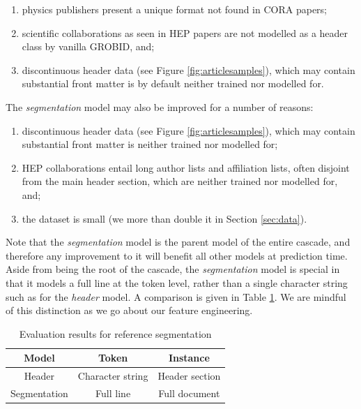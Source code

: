 \begin{enumerate}
\item physics publishers present a unique format not found in CORA papers;
\item scientific collaborations as seen in HEP papers are not modelled as a header class by vanilla GROBID, and;
\item discontinuous header data (see Figure \ref{fig:articlesamples}), which may contain substantial front matter is by default neither trained nor modelled for.
\end{enumerate}

The \emph{segmentation} model may also be improved for a number of reasons:

\begin{enumerate}
\item discontinuous header data (see Figure \ref{fig:articlesamples}), which may contain substantial front matter is neither trained nor modelled for;
\item HEP collaborations entail long author lists and affiliation lists, often disjoint from the main header section, which are neither trained nor modelled for, and;
\item the dataset is small (we more than double it in Section \ref{sec:data}).
\end{enumerate}

Note that the \emph{segmentation} model is the parent model of the entire cascade, and therefore any improvement to it will benefit all other models at prediction time. Aside from being the root of the cascade, the \emph{segmentation} model is special in that it models a full line at the token level, rather than a single character string such as for the \emph{header} model. A comparison is given in Table \ref{table:headervssegmentation}. We are mindful of this distinction as we go about our feature engineering.

\begin{table}[h]
\begin{center}
\begin{tabular}{|c|c|c|}
\hline
Model & Token & Instance \\
\hline
Header & Character string & Header section \\
\hline
Segmentation & Full line & Full document \\
\hline
\end{tabular}
\caption[Comparison of token and instance entities for \emph{header} and \emph{segmentation} models. For information on \emph{fields} tagged by these models, see Section \ref{sec:grobid}.]{Evaluation results for reference segmentation}
\label{table:headervssegmentation}
\end{center}
\end{table}

